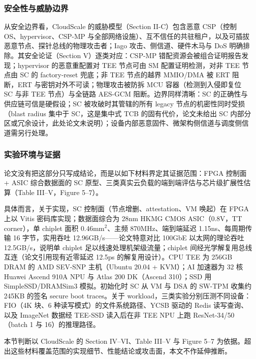\documentclass[11pt]{ctexart}
\begin{document}
\subsubsection{安全性与威胁边界}
从安全边界看，CloudScale 的威胁模型（Section II-C）包含恶意 CSP（控制 OS、hypervisor、CSP-MP 与全部网络设施）、互不信任的共驻租户，以及可插拔恶意节点、探针总线的物理攻击者；Iago 攻击、侧信道、硬件木马与 DoS 明确排除。其安全论证（Section V）逐类对应：CSP-MP 错配资源会被组合证明报告发现；hypervisor 的恶意重配置对 TEE 节点可由 SM 配置证明检测，对非 TEE 节点由 SC 的 factory-reset 兜底；非 TEE 节点的越界 MMIO/DMA 被 ERT 阻断，ERT 与密钥对外不可读；物理攻击被防拆 MCU 容器（检测到入侵即复位 SC 与非 TEE 节点）与全链路 AES-GCM 阻断。边界同样清晰：SC 的正确性与供应链可信是硬假设；SC 被攻破时其管辖的所有 legacy 节点的机密性同时受损（blast radius 集中于 SC，这是集中式 TCB 的固有代价，论文未给出 SC 内部分区或冗余设计，此处论文未说明）；设备内部恶意固件、微架构侧信道与调度侧信道需另行处理。\par
\subsubsection{实验环境与证据}
论文没有把这部分只写成结论，而是以如下材料界定其证据范围：FPGA 控制面 + ASIC 综合数据面的 SC 原型、三类真实云负载的端到端评估与芯片级扩展性估算（Table III--V，Figure 5--7）。\par
具体而言，关于实现，SC 控制面（节点增删、attestation、VM 唤起）在 FPGA 上以 Vitis 密码库实现；数据面综合为 28nm HKMG CMOS ASIC（0.8V，TT corner），单 chiplet 面积 0.46mm$^2$、主频 870MHz、端到端延迟 1.15ns、每周期传输 16 字节，实用吞吐 12.96GB/s——论文特意对比 100GbE 以太网的理论吞吐 12.5GB/s，说明单 chiplet 足以线速处理机架级流量；chiplet 间经光学解复用总线互连（论文引用现有近零延迟 12.5ps 的解复用设计）。CPU TEE 为 256GB DRAM 的 AMD SEV-SNP 主机（Ubuntu 20.04 + KVM）；AI 加速器为 32 核 Huawei Ascend 910A NPU 与 Atlas 200 DK（Ascend 310）；SSD 用 SimpleSSD/DRAMSim3 模拟。初始化时 SC 从 VM 与 DSA 的 SW-TPM 收集约 245KB 的签名 secure boot traces。关于 workload，三类实验分别压测不同设备：FIO（4K 块、6 种读写模式）的文件系统路径、YCSB 驱动的 Redis 读写查询、以及 ImageNet 数据经 TEE-SSD 读入后在非 TEE NPU 上跑 ResNet-34/50（batch 1 与 16）的推理路径。\par
本节判断以 CloudScale 的 Section IV--VI、Table III--V 与 Figure 5--7 为依据。超出这些材料覆盖范围的实现细节、性能结论或攻击面，本文不作延伸推断。\par
\end{document}
